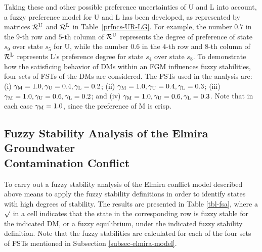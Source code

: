Taking these and other possible preference uncertainties of U and L into account, a fuzzy preference model for U and L has been developed, as represented by matrices $\mathcal{R}^{\rm U}$ and $\mathcal{R}^{\rm L}$ in Table~\ref{prfncs-UR-LG}. For example, the number $0.7$ in the $9$-th row and $5$-th column of $\mathcal{R}^{\rm U}$ represents the degree of preference of state $s_9$ over state $s_5$ for U, while the number $0.6$ in the $4$-th row and $8$-th column of $\mathcal{R}^{\rm L}$ represents L's preference degree for state $s_4$ over state $s_8$. To demonstrate how the satisficing behavior of DMs within an FGM influences fuzzy stabilities, four sets of FSTs of the DMs are considered. The FSTs used in the analysis are: (i) $\gamma_{\rm M}=1.0, \gamma_{\rm U}=0.4, \gamma_{\rm L}=0.2$; (ii) $\gamma_{\rm M}=1.0, \gamma_{\rm U}=0.4, \gamma_{\rm L}=0.3$; (iii) $\gamma_{\rm M}=1.0, \gamma_{\rm U}=0.6, \gamma_{\rm L}=0.2$; and (iv) $\gamma_{\rm M}=1.0, \gamma_{\rm U}=0.6, \gamma_{\rm L}=0.3$. Note that in each case $\gamma_{\rm M}=1.0$, since the preference of M is crisp.

\subsection{Fuzzy Stability Analysis of the Elmira Groundwater
\\Contamination Conflict}\label{subsec-fsa-elmira}

To carry out a fuzzy stability analysis of the Elmira conflict model described above means to apply the fuzzy stability definitions in order to identify states with high degrees of stability. The results are presented in Table \ref{tbl-fsa}, where a $\surd$ in a cell indicates that the state in the corresponding row is fuzzy stable for the indicated DM, or a fuzzy equilibrium, under the indicated fuzzy stability definition. Note that the fuzzy stabilities are calculated for each of the four sets of FSTs mentioned in Subsection \ref{subsec-elmira-model}.


